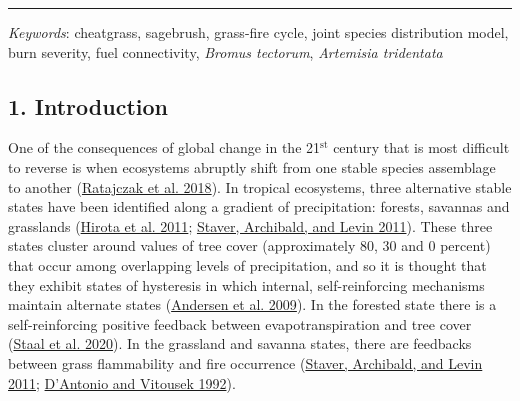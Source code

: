 \documentclass[
  12pt,
]{article}
\begin{document}
\vspace{3mm}
\hrule
\vspace{5mm}

\emph{Keywords}: cheatgrass, sagebrush, grass-fire cycle, joint species
distribution model, burn severity, fuel connectivity, \emph{Bromus
tectorum}, \emph{Artemisia tridentata}

\newpage

\hypertarget{introduction}{%
\subsection{1. Introduction}\label{introduction}}

One of the consequences of global change in the 21\(^\text{st}\) century
that is most difficult to reverse is when ecosystems abruptly shift from
one stable species assemblage to another
(\protect\hyperlink{ref-Ratajczak2018}{Ratajczak et al. 2018}). In
tropical ecosystems, three alternative stable states have been
identified along a gradient of precipitation: forests, savannas and
grasslands (\protect\hyperlink{ref-Hirota2011}{Hirota et al. 2011};
\protect\hyperlink{ref-Staver2011}{Staver, Archibald, and Levin 2011}).
These three states cluster around values of tree cover (approximately
80, 30 and 0 percent) that occur among overlapping levels of
precipitation, and so it is thought that they exhibit states of
hysteresis in which internal, self-reinforcing mechanisms maintain
alternate states (\protect\hyperlink{ref-Andersen2009}{Andersen et al.
2009}). In the forested state there is a self-reinforcing positive
feedback between evapotranspiration and tree cover
(\protect\hyperlink{ref-Staal2020}{Staal et al. 2020}). In the grassland
and savanna states, there are feedbacks between grass flammability and
fire occurrence (\protect\hyperlink{ref-Staver2011}{Staver, Archibald,
and Levin 2011}; \protect\hyperlink{ref-DAntonio1992}{D'Antonio and
Vitousek 1992}).
\end{document}
